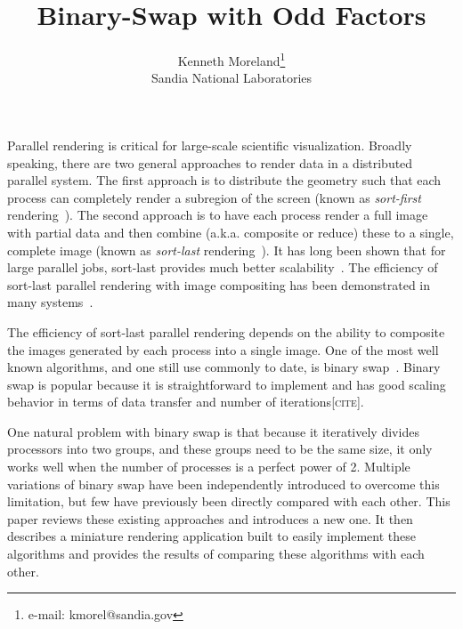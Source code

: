 \documentclass{vgtc}                          %
\title{Binary-Swap with Odd Factors}
\author{
  Kenneth Moreland\thanks{e-mail: kmorel@sandia.gov}\\
  \scriptsize Sandia National Laboratories
}
\newcommand*{\lcite}[1]{~\cite{#1}}
\newcommand*{\keyterm}[1]{\emph{#1}}
\newcommand{\fix}[1]{{\color{red}\textsc{[#1]}}}
\newcommand{\textalgorithm}[1]{\textsf{#1}\xspace}
\newcommand{\binaryswap}{\textalgorithm{binary swap}}
\newcommand{\Binaryswap}{\textalgorithm{Binary swap}}
\begin{document}


\maketitle

Parallel rendering is critical for large-scale scientific visualization.
Broadly speaking, there are two general approaches to render data in a distributed parallel system.
The first approach is to distribute the geometry such that each process can completely render a subregion of the screen (known as \keyterm{sort-first} rendering\lcite{Molnar1994}).
The second approach is to have each process render a full image with partial data and then combine (a.k.a. composite or reduce) these to a single, complete image (known as \keyterm{sort-last} rendering\lcite{Molnar1994}).
It has long been shown that for large parallel jobs, sort-last provides much better scalability\lcite{Wylie2001}.
The efficiency of sort-last parallel rendering with image compositing has been demonstrated in many systems\lcite{Childs2010,Moreland2011:SC,Peterka2009:ICPP,Peterka2013}.

The efficiency of sort-last parallel rendering depends on the ability to composite the images generated by each process into a single image.
One of the most well known algorithms, and one still use commonly to date, is \binaryswap\lcite{BinarySwap2}.
\Binaryswap is popular because it is straightforward to implement and has good scaling behavior in terms of data transfer and number of iterations\fix{cite}.

One natural problem with \binaryswap is that because it iteratively divides processors into two groups, and these groups need to be the same size, it only works well when the number of processes is a perfect power of 2.
Multiple variations of \binaryswap have been independently introduced to overcome this limitation, but few have previously been directly compared with each other.
This paper reviews these existing approaches and introduces a new one.
It then describes a miniature rendering application built to easily implement these algorithms and provides the results of comparing these algorithms with each other.
\end{document}
